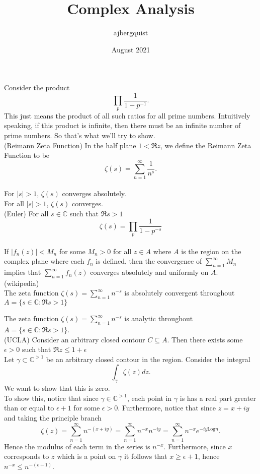 \documentclass{article}
\title{Complex Analysis}
\author{ajbergquist }
\date{August 2021}
\theoremstyle{definition}
\newcommand{\C}{\mathbb{C}}
\newcommand{\Log}{\mbox{Log}}
\newcommand{\infsum}{\sum_{n = 1}^{\infty}}
\begin{document}
Consider the product
$$
\prod_p\frac{1}{1-p^{-1}}.
$$
This just means the product of all such ratios for all prime numbers. Intuitively speaking, if this product is infinite, then there must be an infinite number of prime numbers. So that's what we'll try to show.
\\

(Reimann Zeta Function) In the half plane $1< \Re z$, we define the Reimann Zeta Function to be $$\zeta(s) = \infsum \frac{1}{n^s}.$$\\

 For $|s| > 1$, $\zeta(s)$ converges absolutely.\\ 

 For all $|s|> 1$, $\zeta(s)$ converges.
\\


 (Euler) For all $s\in \C$ such that $\Re s > 1$ $$\zeta(s) = \prod_p\frac{1}{1-p^{-s}}$$\\
 If $|f_n(z)| < M_n$ for some $M_n > 0$ for all $z\in A$ where $A$ is the region on the complex plane where each $f_n$ is defined, then the convergence of $\infsum M_n$ implies that $\infsum f_n(z)$ converges absolutely and uniformly on $A$.\\



 (wikipedia)\\

 The zeta function $\zeta(s) = \infsum n^{-s}$ is absolutely convergent throughout $A = \{s\in\C:\Re s > 1\}$

 The zeta function $\zeta(s) = \infsum n^{-s}$ is analytic throughout $A = \{s\in\C:\Re s > 1\}$.\\

 (UCLA) Consider an arbitrary closed contour $C \subseteq A$. Then there exists some $\epsilon > 0$ such that $\Re z \le 1 + \epsilon$\\



Let $\gamma\subset\C^{>1}$ be an arbitrary closed contour in the region. Consider the integral 
$$\int_\gamma\zeta(z)dz.$$ We want to show that this is zero.\\

To show this, notice that since $\gamma\in \C^{>1}$, each point in $\gamma$ is has a real part greater than or equal to $\epsilon +1$ for some $\epsilon > 0$. Furthermore, notice that since $z = x + iy$ and taking the principle branch
$$\zeta(z) = \infsum n^{-(x+iy)} = \infsum n^{-x}n^{-iy} = \infsum n^{-x}e^{-iy\Log n}.$$
Hence the modulus of each term in the series is $n^{-x}$. Furthermore, since $x$ corresponds to $z$ which is a point on $\gamma$ it follows that $x \ge \epsilon  + 1$, hence $n^{-x} \le n^{-(\epsilon + 1)}$.\\
\end{document}
